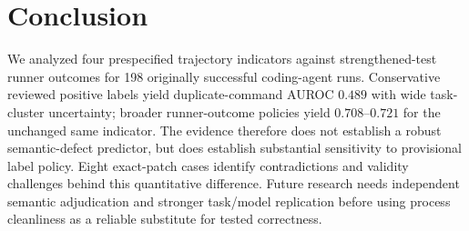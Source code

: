\documentclass[journal]{IEEEtran}
\begin{document}
\section{Conclusion}
We analyzed four prespecified trajectory indicators against strengthened-test runner outcomes for 198 originally successful coding-agent runs. Conservative reviewed positive labels yield duplicate-command AUROC $0.489$ with wide task-cluster uncertainty; broader runner-outcome policies yield $0.708$--$0.721$ for the unchanged same indicator. The evidence therefore does not establish a robust semantic-defect predictor, but does establish substantial sensitivity to provisional label policy. Eight exact-patch cases identify contradictions and validity challenges behind this quantitative difference. Future research needs independent semantic adjudication and stronger task/model replication before using process cleanliness as a reliable substitute for tested correctness.



\end{document}
